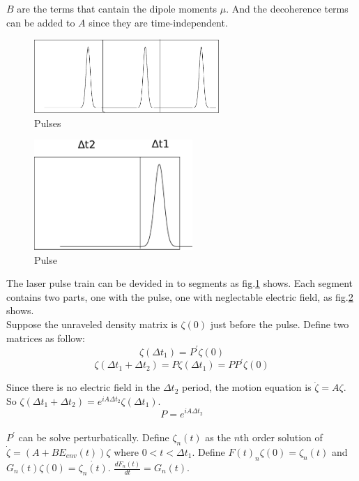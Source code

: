 \documentclass[11pt,a4paper]{article}
\begin{document}
$B$ are the terms that cantain the dipole moments $\mu$. And the decoherence terms can be added to $A$ since they are time-independent.\\
\begin{figure}[H]
  \centering
  \includegraphics[width=7cm]{pulses.eps}
  \caption{Pulses}
  \label{fig:pulses}
\end{figure}
\begin{figure}[H]
  \centering
  \includegraphics[width=6cm]{pulse.eps}
  \caption{Pulse}
  \label{fig:pulse}
\end{figure}
The laser pulse train can be devided in to segments as fig.\ref{fig:pulses} shows. Each segment contains two parts, one with the pulse, one with neglectable electric field, as fig.\ref{fig:pulse} shows.\\

Suppose the unraveled density matrix is $\zeta(0)$ just before the pulse. Define two matrices as follow:
\[
\zeta(\Delta t_1) = P^{\prime} \zeta(0)
\]
\[
\zeta(\Delta t_1+\Delta t_2) = P \zeta(\Delta t_{1}) = P P^{\prime} \zeta(0)
\]

Since there is no electric field in the $\Delta t_2$ period, the motion equation is $\dot{\zeta} = A \zeta$. So $\zeta(\Delta t_1+\Delta t_2) = e^{i A \Delta t_{2}} \zeta(\Delta t_{1})$.
\[
P = e^{i A \Delta t_2}
\]
\\

$P^{\prime}$ can be solve perturbatically. Define $\zeta_n (t)$ as the $n$th order solution of $\dot{\zeta} = \left( A + B E_{env}(t) \right) \zeta$ where $0< t < \Delta t_{1}$. Define $F(t)_{n} \zeta(0) = \zeta_{n}(t)$ and $G_{n}(t) \zeta(0) = \dot{\zeta_{n}(t)}$. $\frac{d F_{n}(t)}{dt} = G_{n}(t)$.\\
\end{document}
